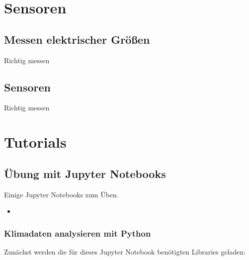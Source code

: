 \documentclass[letterpaper,10pt,english]{jupyterBook}
\begin{document}
\sphinxAtStartPar
{}

\sphinxstepscope


\part{Sensoren}

\sphinxstepscope


\chapter{Messen elektrischer Größen}
\label{\detokenize{content/4_ElektrischeGroessen:messen-elektrischer-groszen}}\label{\detokenize{content/4_ElektrischeGroessen::doc}}
\sphinxAtStartPar
Richtig messen

\sphinxstepscope


\chapter{Sensoren}
\label{\detokenize{content/4_Sensoren:sensoren}}\label{\detokenize{content/4_Sensoren::doc}}
\sphinxAtStartPar
Richtig messen

\sphinxstepscope


\part{Tutorials}

\sphinxstepscope


\chapter{Übung mit Jupyter Notebooks}
\label{\detokenize{content/1_Tutorials:ubung-mit-jupyter-notebooks}}\label{\detokenize{content/1_Tutorials::doc}}
\sphinxAtStartPar
Einige Jupyter Notebooks zum Üben.
\begin{itemize}
\item {} 
\sphinxAtStartPar
{\hyperref[\detokenize{content/1_APy_Plotten::doc}]{}}

\end{itemize}

\sphinxstepscope


\section{Klimadaten analysieren mit Python}
\label{\detokenize{content/1_APy_Plotten:klimadaten-analysieren-mit-python}}\label{\detokenize{content/1_APy_Plotten::doc}}
\sphinxAtStartPar
Zunächst werden die für dieses Jupyter Notebook benötigten Libraries geladen:
\end{document}
